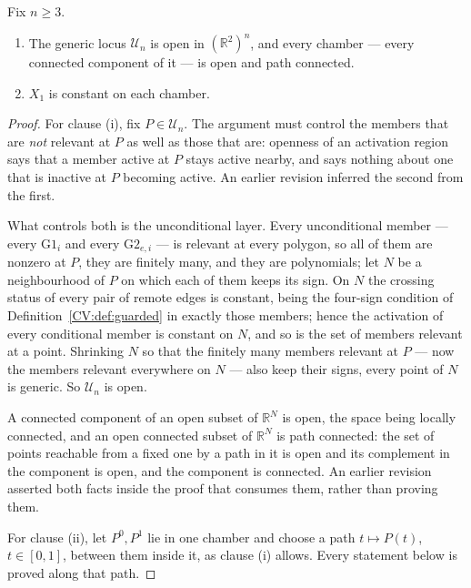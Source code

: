 \begin{proposition}\label{CV:prop:chamberinv}\leanok
Fix $n\geq3$.
\begin{enumerate}
\item[(i)] The generic locus $\mathcal U_n$ is open in $(\mathbb R^2)^n$, and
every chamber --- every connected component of it --- is open and path connected.
\item[(ii)] $X_1$ is constant on each chamber.
\end{enumerate}
\end{proposition}
\begin{proof}\leanok{}
For clause (i), fix $P\in\mathcal U_n$. The argument must control the members that are
\emph{not} relevant at $P$ as well as those that are: openness of an activation
region says that a member active at $P$ stays active nearby, and says nothing
about one that is inactive at $P$ becoming active. An earlier revision inferred
the second from the first.

What controls both is the unconditional layer. Every unconditional member ---
every $\mathrm{G1}_i$ and every $\mathrm{G2}_{e,i}$ --- is relevant at every
polygon, so all of them are nonzero at $P$, they are finitely many, and they are
polynomials; let $N$ be a neighbourhood of $P$ on which each of them keeps its
sign. On $N$ the crossing status of every pair of remote edges is constant,
being the four-sign condition of Definition~\ref{CV:def:guarded} in exactly those
members; hence the activation of every conditional member is constant on $N$,
and so is the set of members relevant at a point. Shrinking $N$ so that the
finitely many members relevant at $P$ --- now the members relevant everywhere on
$N$ --- also keep their signs, every point of $N$ is generic. So
$\mathcal U_n$ is open.

A connected component of an open subset of $\mathbb R^N$ is open, the space
being locally connected, and an open connected subset of $\mathbb R^N$ is path
connected: the set of points reachable from a fixed one by a path in it is open
and its complement in the component is open, and the component is connected. An
earlier revision asserted both facts inside the proof that consumes them,
rather than proving them.

For clause (ii), let $P^{0},P^{1}$ lie in one chamber and choose a path
$t\mapsto P(t)$, $t\in[0,1]$, between them inside it, as clause (i) allows.
Every statement below is proved along that path.


\end{proof}
